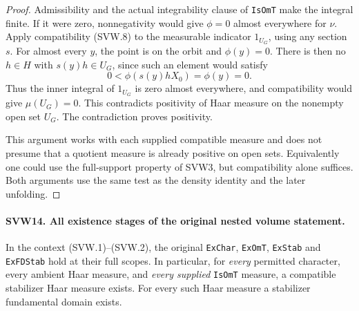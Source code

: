 \documentclass[11pt,a4paper]{article}
\numberwithin{equation}{section}
\theoremstyle{remark}\newtheorem{remark}[theorem]{Remark}
\begin{document}
\begin{proof}
Admissibility and the actual integrability clause of
\texttt{Is\allowbreak Om\allowbreak T} make the integral finite.  If it were zero,
nonnegativity would give $\phi=0$ almost everywhere for $\nu$.
Apply compatibility (SVW.8) to the measurable indicator $1_{U_G}$,
using any section $s$.  For almost every $y$, the point is on
the orbit and $\phi(y)=0$.  There is then no $h\in H$ with
$s(y)h\in U_G$, since such an element would satisfy
\[
                 0<\phi(s(y)hX_0)=\phi(y)=0.
\]
Thus the inner integral of $1_{U_G}$ is zero almost everywhere,
and compatibility would give $\mu(U_G)=0$.  This contradicts
positivity of Haar measure on the nonempty open set $U_G$.
The contradiction proves positivity.

This argument works with each supplied compatible measure and
does not presume that a quotient measure is already positive on
open sets.  Equivalently one could use the full-support property
of SVW3, but compatibility alone suffices.  Both arguments use
the same test as the density identity and the later unfolding.
\end{proof}

\paragraph{SVW14. All existence stages of the original nested volume statement.}
\label{claim:SVW14}
In the context (SVW.1)--(SVW.2), the original \texttt{Ex\allowbreak Char},
\texttt{Ex\allowbreak Om\allowbreak T}, \texttt{Ex\allowbreak Stab} and \texttt{Ex\allowbreak FDStab} hold at their
full scopes.  In particular, for \emph{every} permitted character,
every ambient Haar measure, and \emph{every supplied}
\texttt{Is\allowbreak Om\allowbreak T} measure, a compatible stabilizer Haar measure exists.
For every such Haar measure a stabilizer fundamental domain exists.
\end{document}
